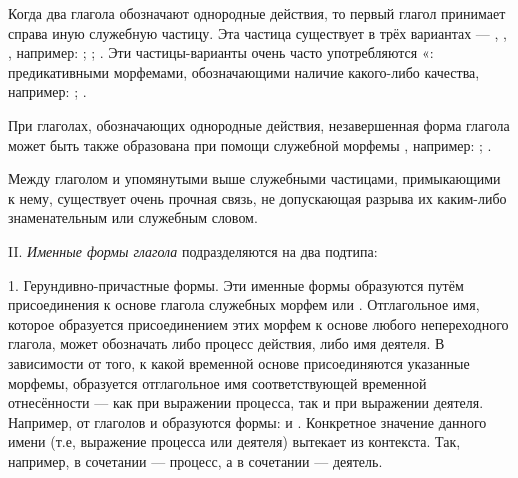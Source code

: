 Когда два глагола обозначают однородные действия, то первый глагол принимает справа иную служебную частицу. Эта частица существует в трёх вариантах --- , , , например:
;
;
.
Эти частицы-варианты очень часто употребляются «: предикативными морфемами, обозначающими наличие какого-либо качества, например:
;
.

При глаголах, обозначающих однородные действия, незавершенная форма глагола может быть также образована при помощи служебной морфемы , например:
;
.

Между глаголом и упомянутыми выше служебными частицами, примыкающими к нему, существует очень прочная связь, не допускающая разрыва их каким-либо знаменательным или служебным словом.

II. \emph{Именные формы глагола} подразделяются на два подтипа:

1. Герундивно-причастные формы. Эти именные формы образуются путём присоединения к основе глагола служебных морфем  или . Отглагольное имя, которое образуется присоединением этих морфем к основе любого непереходного глагола, может обозначать либо процесс действия, либо имя деятеля. В зависимости от того, к какой временной основе присоединяются указанные морфемы, образуется отглагольное имя соответствующей временной отнесённости --- как при выражении процесса, так и при выражении деятеля. Например, от глаголов  и  образуются формы:  и . Конкретное значение данного имени (т.е, выражение процесса или деятеля) вытекает из контекста. Так, например, в сочетании   --- процесс, а в сочетании   --- деятель.

